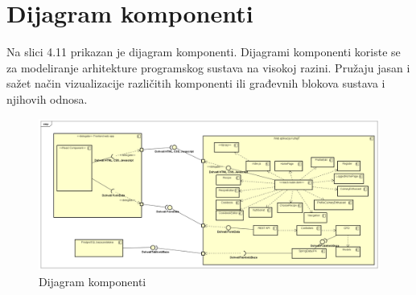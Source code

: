 		\eject
		
		\section{Dijagram komponenti}
		Na slici 4.11 prikazan je dijagram komponenti. Dijagrami komponenti koriste se za modeliranje arhitekture programskog sustava na visokoj razini. Pružaju jasan i sažet način vizualizacije različitih komponenti ili građevnih blokova sustava i njihovih odnosa.
		
					\begin{figure}[H]
			\includegraphics[scale=0.2]{dijagrami/UML_dijagram_komponenti.png} %
			\centering
			\caption{Dijagram komponenti}
			\label{Dijagram komponenti}
		\end{figure}
		
		\eject
		
		
		

